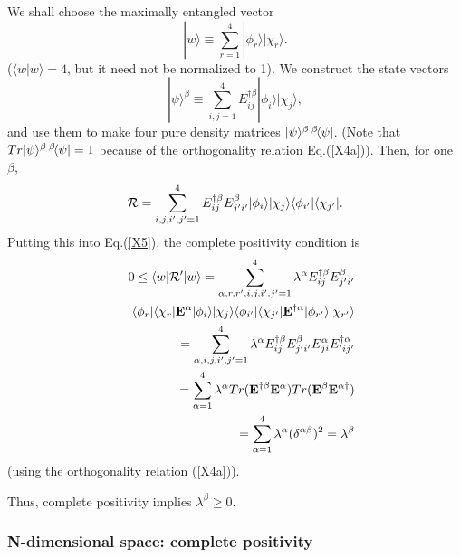 \documentclass[aps,pra,twocolumn,amssymb, amsfonts,amsmath,showpacs, superscriptaddress]{revtex4}
\begin{document}
    We shall choose the maximally entangled vector
\begin{equation}
|w\rangle\equiv\sum_{r=1}^{4}|\phi_{r}\rangle |\chi_{r}\rangle. \nonumber
\end{equation}
\noindent ($\langle w|w\rangle=4$, but it need not be normalized to 1). We construct the state vectors 
\[
|\psi\rangle^{\beta}\equiv\sum_{i,j=1}^{4}E_{ij}^{\dagger\beta}|\phi_{i}\rangle |\chi_{j}\rangle, 
\]
\noindent and  use them to make  four pure density matrices $|\psi\rangle^{\beta}\thinspace^{\beta}\negthinspace\langle\psi|$. (Note that $Tr|\psi\rangle^{\beta}\thinspace^{\beta}\negthinspace\langle\psi|=1$ because of the orthogonality relation Eq.(\ref{X4a})).  Then, for one $\beta$,   
\[
{\cal R}=\sum_{i,j,i',j'=1}^{4}E_{ij}^{\dagger\beta}E_{j'i'}^{\beta}|\phi_{i}\rangle |\chi_{j}\rangle\langle\phi_{i'}|\langle \chi_{j'}|. 
\]
\noindent  Putting this into Eq.(\ref{X5}), the complete positivity condition is 
\begin{eqnarray}
&&0\leq\langle w|{\cal R}'|w\rangle= \sum_{\alpha, r,r',i,j,i',j'=1}^{4}\lambda^{\alpha}E_{ij}^{\dagger\beta}E_{j'i'}^{\beta}\nonumber\\
&&\langle\phi_{r}|\langle \chi_{r}|{\bf E}^{\alpha}|\phi_{i}\rangle |\chi_{j}\rangle\langle\phi_{i'}|\langle \chi_{j'}| {\bf E}^{\dagger\alpha}
|\phi_{r'}\rangle |\chi_{r'}\rangle\nonumber\\
&&=\sum_{\alpha,i,j,i',j'=1}^{4}\lambda^{\alpha}E_{ij}^{\dagger\beta}E_{j'i'}^{\beta}E_{ji}^{\alpha}E_{'ij'}^{\dagger\alpha}\nonumber\\
&&=\sum_{\alpha=1}^{4}\lambda^{\alpha}Tr({\bf E}^{\dagger\beta}{\bf E}^{\alpha})Tr({\bf E}^{\beta}{\bf E}^{\alpha\dagger})\nonumber\\
&&=\sum_{\alpha=1}^{4}\lambda^{\alpha}
(\delta^{\alpha\beta})^{2}=\lambda^{\beta}\nonumber
\end{eqnarray}
\noindent (using the orthogonality relation (\ref{X4a})).

Thus, complete positivity implies $\lambda^{\beta}\geq 0$. 

\subsubsection{N-dimensional space: complete positivity}
\end{document}
